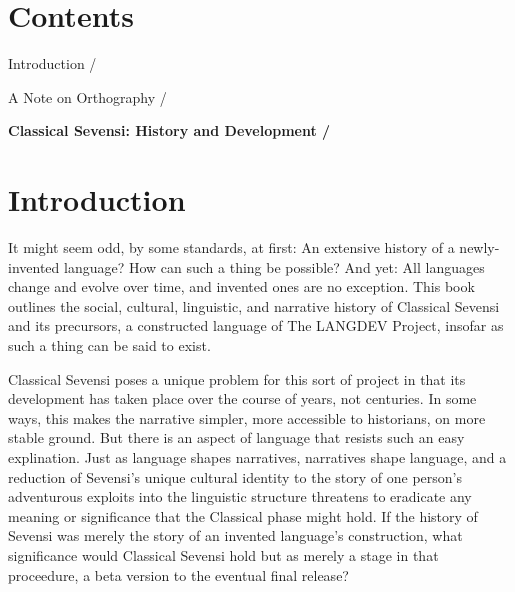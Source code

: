 \emptybreak


\chapter*{Contents}
\thispagestyle{empty}
\begin{table}[hbp]

\begin{small}

Introduction / \pageref{introduction}

\medskip

A Note on Orthography / \pageref{orthography}

\end{small}

\bigskip

\textbf{Classical Sevensi: History and Development / \pageref{text}}

\end{table}

\emptybreak


\pagestyle{plain}
\chapter*{Introduction} \label{introduction}

It might seem odd, by some standards, at first: An extensive history of a newly-invented language?
How can such a thing be possible?
And yet: All languages change and evolve over time, and invented ones are no exception.
This book outlines the social, cultural, linguistic, and narrative history of Classical Sevensi and its precursors, a constructed language of The LANGDEV Project, insofar as such a thing can be said to exist.

Classical Sevensi poses a unique problem for this sort of project in that its development has taken place over the course of years, not centuries.
In some ways, this makes the narrative simpler, more accessible to historians, on more stable ground.
But there is an aspect of language that resists such an easy explination.
Just as language shapes narratives, narratives shape language, and a reduction of Sevensi's unique cultural identity to the story of one person's adventurous exploits into the linguistic structure threatens to eradicate any meaning or significance that the Classical phase might hold.
If the history of Sevensi was merely the story of an invented language's construction, what significance would Classical Sevensi hold but as merely a stage in that proceedure, a beta version to the eventual final release?

